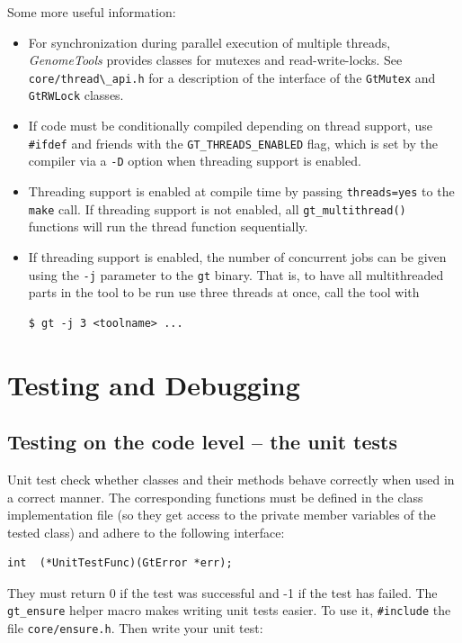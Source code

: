 \documentclass[11pt,final]{article}
\newcommand{\keyword}[1]{\lstinline{#1}}
\newcommand{\Gt}[0]{\emph{GenomeTools}\xspace}
\begin{document}
Some more useful information:
\begin{itemize}
\item
For synchronization during parallel execution of multiple threads, \Gt provides
classes for mutexes and read-write-locks. See \keyword{core/thread\_api.h} for a
description of the interface of the \keyword{GtMutex} and \keyword{GtRWLock}
classes.
\item
If code must be conditionally compiled depending on thread support, use
\keyword{#ifdef} and friends with the \keyword{GT_THREADS_ENABLED} flag, which
is set by the compiler via a \keyword{-D} option when threading support is
enabled.
\item
Threading support is enabled at compile time by passing \keyword{threads=yes} to
the \keyword{make} call. If threading support is not enabled, all
\keyword{gt_multithread()} functions will run the thread function sequentially.
\item
If threading support is enabled, the number of concurrent jobs can be given
using the \keyword{-j} parameter to the \keyword{gt} binary. That is, to have
all multithreaded parts in the tool to be run use three threads at once, call
the tool with

\begin{lstlisting}
$ gt -j 3 <toolname> ...
\end{lstlisting}%

\end{itemize}


\section{Testing and Debugging}
\subsection{Testing on the code level -- the unit tests}
\label{unittests}

Unit test check whether classes and their methods behave correctly when used in
a correct manner. The corresponding functions must be defined in the class
implementation file (so they get access to the private member variables of the
tested class) and adhere to the following interface:

\begin{lstlisting}
int  (*UnitTestFunc)(GtError *err);
\end{lstlisting}

They must return 0 if the test was successful and -1 if the test has failed.
The \keyword{gt_ensure} helper macro makes writing unit tests easier. To use it,
\keyword{#include} the file \keyword{core/ensure.h}. Then write your unit test:
\end{document}
